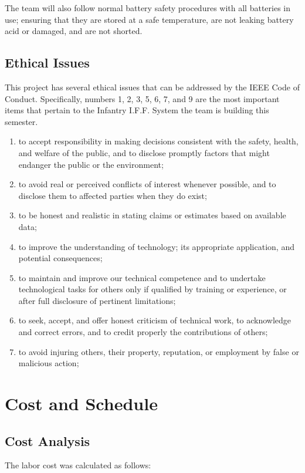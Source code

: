 \documentclass[letterpaper,10pt]{article}
\makeatletter
\newcommand{\skipitems}[1]{%
	\addtocounter{\@enumctr}{#1}%
}
\makeatother
\begin{document}
\begin{spacing}{1.15}
The team will also follow normal battery safety procedures with all batteries in use; ensuring that they are stored at a safe temperature, are not leaking battery acid or damaged, and are not shorted. 


\subsection{Ethical Issues}
This project has several ethical issues that can be addressed by the IEEE Code of Conduct. Specifically, numbers 1, 2, 3, 5, 6, 7, and 9 are the most important items that pertain to the Infantry I.F.F. System the team is building this semester. 
\begin{enumerate}
\item to accept responsibility in making decisions consistent with the safety, health, and welfare of the public, and to disclose promptly factors that might endanger the public or the environment;
\item to avoid real or perceived conflicts of interest whenever possible, and to disclose them to affected parties when they do exist;
\item to be honest and realistic in stating claims or estimates based on available data;  
\skipitems{1}
\item to improve the understanding of technology; its appropriate application, and potential consequences;  
\item to maintain and improve our technical competence and to undertake technological tasks for others only if qualified by training or experience, or after full disclosure of pertinent limitations;  
\item to seek, accept, and offer honest criticism of technical work, to acknowledge and correct errors, and to credit properly the contributions of others;  
\skipitems{1}
\item to avoid injuring others, their property, reputation, or employment by false or malicious action;  
\end{enumerate}

\section{Cost and Schedule}

\subsection{Cost Analysis}
The labor cost was calculated as follows:


\end{spacing}
\end{document}
